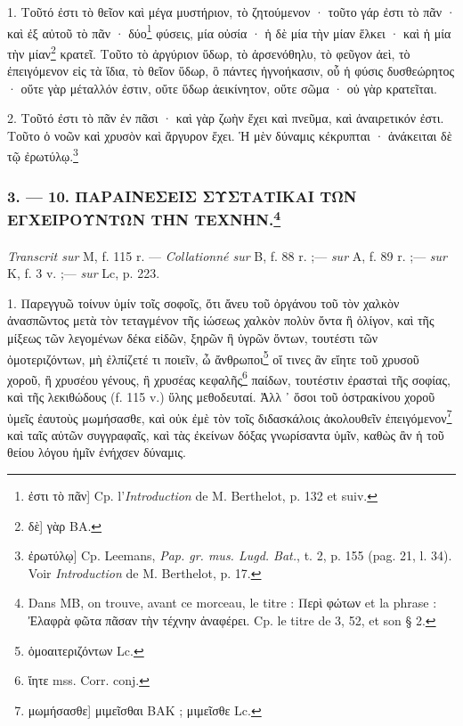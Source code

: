\documentclass[a4paper, 11pt, oneside, polutonikogreek, french]{article}
\begin{document}
\bigskip

1. Τοῦτό ἐστι τὸ θεῖον καὶ μέγα μυστήριον, τὸ ζητούμενον · τοῦτο γάρ ἐστι τὸ πᾶν · καὶ ἐξ αὐτοῦ τὸ πᾶν · δύο\footnote{ἐστι τὸ πᾶν] Cp. l'\emph{Introduction} de M. Berthelot, p. 132 et suiv.} φύσεις, μία οὐσία · ἡ δὲ μία τὴν μίαν ἕλκει · καὶ ἡ μία τὴν μίαν\footnote{δὲ] γὰρ BA.} κρατεῖ. Τοῦτο τὸ ἀργύριον ὕδωρ, τὸ ἀρσενόθηλυ, τὸ φεῦγον ἀεὶ, τὸ ἐπειγόμενον εἰς τὰ ἴδια, τὸ θεῖον ὕδωρ, ὃ πάντες ἠγνοήκασιν, οὗ ἡ φύσις δυσθεώρητος · οὔτε γὰρ μέταλλόν ἐστιν, οὔτε ὕδωρ ἀεικίνητον, οὔτε σῶμα · οὐ γὰρ κρατεῖται.

2. Τοῦτό ἐστι τὸ πᾶν ἐν πᾶσι · καὶ γὰρ ζωὴν ἔχει καὶ πνεῦμα, καὶ ἀναιρετικόν ἐστι. Τοῦτο ὁ νοῶν καὶ χρυσὸν καὶ ἄργυρον ἔχει. Ἡ μὲν δύναμις κέκρυπται · ἀνάκειται δὲ τῷ ἐρωτύλῳ.\footnote{ἐρωτύλῳ] Cp. Leemans, \emph{Pap. gr. mus. Lugd. Bat.}, t. 2, p. 155 (pag. 21, l. 34). Voir \emph{Introduction} de M. Berthelot, p. 17.}

\bigskip
\centerline{\EightStarTaper}
\centerline{\EightStarTaper\EightStarTaper}
\bigskip

\subsubsection[3. --- 10. ΠΑΡΑΙΝΕΣΕΙΣ ΣΥΣΤΑΤΙΚΑΙ ΤΩΝ ΕΓΧΕΙΡΟΥΝΤΩΝ ΤΗΝ ΤΕΧΝΗΝ.]{3. --- 10. ΠΑΡΑΙΝΕΣΕΙΣ ΣΥΣΤΑΤΙΚΑΙ ΤΩΝ ΕΓΧΕΙΡΟΥΝΤΩΝ ΤΗΝ ΤΕΧΝΗΝ.\footnote{Dans MB, on trouve, avant ce morceau, le titre : Περὶ φώτων et la phrase : Ἐλαφρὰ φῶτα πᾶσαν τὴν τέχνην ἀναφέρει. Cp. le titre de 3, 52, et son § 2.}}
\paragraph{}
\emph{Transcrit sur} M, f. 115 r. --- \emph{Collationné sur} B, f. 88 r. ;--- \emph{sur} A, f. 89 r. ;--- \emph{sur} K, f. 3 v. ;--- \emph{sur} Lc, p. 223.

\bigskip

1. Παρεγγυῶ τοίνυν ὑμίν τοῖς σοφοῖς, ὅτι ἄνευ τοῦ ὀργάνου τοῦ τὸν χαλκὸν ἀνασπῶντος μετὰ τὸν τεταγμένον τῆς ἰώσεως χαλκὸν πολὺν ὄντα ἢ ὀλίγον, καὶ τῆς μίξεως τῶν λεγομένων δέκα εἰδῶν, ξηρῶν ἢ ὑγρῶν ὅντων, τουτέστι τῶν ὁμοτεριζόντων, μὴ ἐλπίζετέ τι ποιεῖν, ὦ ἄνθρωποι\footnote{ὁμοαιτεριζόντων Lc.} οἵ τινες ἂν εἴητε τοῦ χρυσοῦ χοροῦ, ἢ χρυσέου γένους, ἢ χρυσέας κεφαλῆς\footnote{ἴητε mss. Corr. conj.} παίδων, τουτέστιν ἐρασταὶ τῆς σοφίας, καὶ τῆς λεκιθώδους (f. 115 v.) ὕλης μεθοδευταί. Ἀλλ ᾽ ὅσοι τοῦ ὀστρακίνου χοροῦ ὑμεῖς ἐαυτοὺς μωμήσασθε, καὶ οὐκ ἐμὲ τὸν τοῖς διδασκάλοις ἀκολουθεῖν ἐπειγόμενον\footnote{μωμήσασθε] μιμεῖσθαι BAK ; μιμεῖσθε Lc.} καὶ ταῖς αὐτῶν συγγραφαῖς, καὶ τὰς ἐκείνων δόξας γνωρίσαντα ὑμῖν, καθὼς ἂν ἡ τοῦ θείου λόγου ἡμῖν ἐνήχσεν δύναμις.
\end{document}

